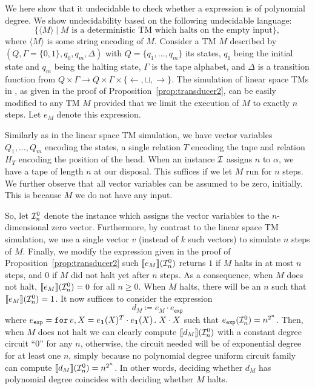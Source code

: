 We here show that it undecidable to check whether a \langfor expression is of polynomial degree.
We show undecidability based on the following undecidable language:
    $$
    \{ \langle M\rangle\mid \text{$M$ is a deterministic TM which halts on the empty input}\},
    $$
    where $\langle M\rangle$ is some string encoding of $M$.
    Consider a TM $M$ described by $(Q,\Gamma=\{0,1\},q_0,q_m,\Delta)$
    with $Q=\{q_1,\ldots,q_m\}$ its states, $q_1$ being the initial state and $q_m$ being
    the halting state, $\Gamma$ is the tape alphabet, and $\Delta$ is a transition function
    from $Q\times \Gamma\to Q\times\Gamma\times \{\leftarrow,\sqcup,\rightarrow\}$. The simulation
    of linear space TMs in \langfor, as given in the proof of Proposition~\ref{prop:transducer2}, can be easily modified to
    any TM $M$ provided that we limit the execution of $M$ to exactly $n$ steps. Let $e_M$ denote this expression. 
	
	Similarly
    as in the linear space TM simulation, we have vector variables $Q_1,\ldots,Q_m$ encoding the
    states, a single relation $T$ encoding the tape and relation $H_T$ encoding the position
    of the head.  When an instance $\mathcal{I}$ assigns $n$ to $\alpha$, we have a tape of length $n$ at our disposal. This suffices if we let $M$ run for $n$ steps. We further observe that all vector variables can be assumed to be zero, initially.
    This is because $M$ we do not have any input. 
	
	So, let $\mathcal{I}_n^0$ denote the instance which assigns the vector variables to the $n$-dimensional zero vector.  Furthermore, by contrast to the linear space TM simulation, we use a single vector $v$ (instead of $k$ such vectors) to simulate $n$ steps of $M$. Finally, we modify the expression given in the proof of Proposition~\ref{prop:transducer2} such $\llbracket e_M \rrbracket(\mathcal{I}_n^0)$  returns $1$ if $M$
    halts in at most $n$ steps, and $0$ if $M$ did not halt yet after $n$ steps.
    As a consequence, when $M$ does not halt, $\llbracket e_M \rrbracket(\mathcal{I}_n^0)=0$ for all $n\geq 0$. When $M$ halts, there will be an $n$ such that $\llbracket e_M \rrbracket(\mathcal{I}_n^0)=1$. It now suffices to consider the \langfor expression
    $$
    d_M\coloneqq e_M\cdot e_{\mathsf{exp}}
    $$
    where $e_{\texttt{exp}} = \texttt{for}\, v,X=e_{\mathbf{1}}(X)^T\cdot e_{\mathbf{1}}(X) \texttt{.}\, X\cdot X$ such that
    $e_{\texttt{exp}}(\mathcal{I}_n^0)=n^{2^n}$. Then, when $M$ does not halt we can clearly compute $\llbracket d_M \rrbracket(\mathcal{I}_n^0)$ with a constant degree circuit ``0''
    for any $n$, otherwise, the circuit needed will be of exponential degree
    for at least one $n$, simply because no polynomial degree uniform  circuit family can compute $\llbracket d_M \rrbracket(\mathcal{I}_n^0)=n^{2^n}$. In other words, deciding whether $d_M$ has polynomial degree coincides with deciding whether $M$ halts.
